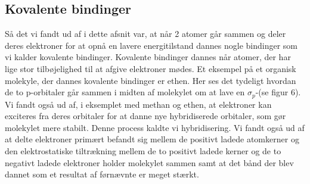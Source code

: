 \subsection{Kovalente bindinger}
Så det vi fandt ud af i dette afsnit var, at når 2 atomer går sammen og deler deres elektroner for at opnå en lavere energitilstand dannes nogle bindinger som vi kalder kovalente bindinger. Kovalente bindinger dannes når atomer, der har lige stor tilbøjelighed til at afgive elektroner mødes. Et eksempel på et organisk molekyle, der dannes kovalente bindinger er ethen. Her ses det tydeligt hvordan de to p-orbitaler går sammen i midten af molekylet om at lave en $\sigma_p$-(se figur 6). Vi fandt også ud af, i eksemplet med methan og ethen, at elektroner kan exciteres fra deres orbitaler for at danne nye hybridiserede orbitaler, som gør molekylet mere stabilt. Denne process kaldte vi hybridisering. Vi fandt også ud af at delte elektroner primært befandt sig mellem de positivt ladede atomkerner og den elektrostatiske tiltrækning mellem de to positivt ladede kerner og de to negativt ladede elektroner holder molekylet sammen samt at det bånd der blev dannet som et resultat af førnævnte er meget stærkt.